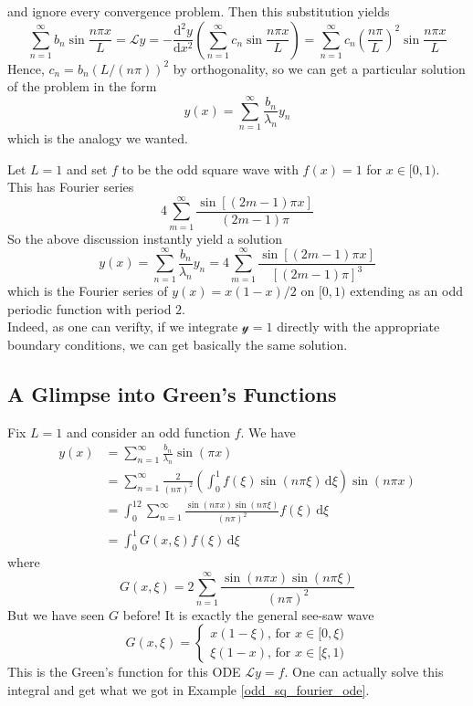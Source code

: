 and ignore every convergence problem.
Then this substitution yields
$$\sum_{n=1}^\infty b_n\sin\frac{n\pi x}{L}=\mathcal Ly=-\frac{\mathrm d^2y}{\mathrm dx^2}\left( \sum_{n=1}^\infty c_n\sin\frac{n\pi x}{L} \right)=\sum_{n=1}^\infty c_n\left( \frac{n\pi}{L} \right)^2\sin\frac{n\pi x}{L}$$
Hence, $c_n=b_n(L/(n\pi))^2$ by orthogonality, so we can get a particular solution of the problem in the form
$$y(x)=\sum_{n=1}^\infty \frac{b_n}{\lambda_n}y_n$$
which is the analogy we wanted.
\begin{example}\label{odd_sq_fourier_ode}
    Let $L=1$ and set $f$ to be the odd square wave with $f(x)=1$ for $x\in[0,1)$.
    This has Fourier series
    $$4\sum_{m=1}^\infty\frac{\sin[(2m-1)\pi x]}{(2m-1)\pi}$$
    So the above discussion instantly yield a solution
    $$y(x)=\sum_{n=1}^\infty \frac{b_n}{\lambda_n}y_n=4\sum_{m=1}^\infty\frac{\sin[(2m-1)\pi x]}{[(2m-1)\pi]^3}$$
    which is the Fourier series of $y(x)=x(1-x)/2$ on $[0,1)$ extending as an odd periodic function with period $2$.\\
    Indeed, as one can verifty, if we integrate $\mathcal y=1$ directly with the appropriate boundary conditions, we can get basically the same solution.
\end{example}
\subsection{A Glimpse into Green's Functions}
Fix $L=1$ and consider an odd function $f$.
We have
\begin{align*}
    y(x)&=\sum_{n=1}^\infty\frac{b_n}{\lambda_n}\sin(\pi x)\\
    &=\sum_{n=1}^\infty\frac{2}{(n\pi)^2}\left(\int_0^1f(\xi)\sin(n\pi\xi)\,\mathrm d\xi\right)\sin(n\pi x)\\
    &=\int_0^12\sum_{n=1}^\infty\frac{\sin(n\pi x)\sin(n\pi\xi)}{(n\pi)^2}f(\xi)\,\mathrm d\xi\\
    &=\int_0^1G(x,\xi)f(\xi)\,\mathrm d\xi
\end{align*}
where
$$G(x,\xi)=2\sum_{n=1}^\infty\frac{\sin(n\pi x)\sin(n\pi\xi)}{(n\pi)^2}$$
But we have seen $G$ before!
It is exactly the general see-saw wave
$$G(x,\xi)=\begin{cases}
    x(1-\xi)\text{, for $x\in[0,\xi)$}\\
    \xi(1-x)\text{, for $x\in[\xi,1)$}
\end{cases}$$
This is the Green's function for this ODE $\mathcal Ly=f$.
One can actually solve this integral and get what we got in Example \ref{odd_sq_fourier_ode}.